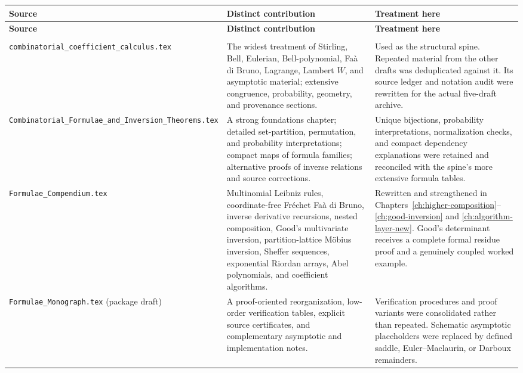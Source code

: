 \documentclass[11pt,a4paper,oneside,openany]{book}
\theoremstyle{definition}
\theoremstyle{remark}
\begin{document}
\renewcommand{\arraystretch}{1.15}
\begin{longtable}{>{\raggedright\arraybackslash}p{}
                  >{\raggedright\arraybackslash}p{}
                  >{\raggedright\arraybackslash}p{}}
\toprule
\textbf{Source} & \textbf{Distinct contribution} & \textbf{Treatment here}\\
\midrule
\endfirsthead
\toprule
\textbf{Source} & \textbf{Distinct contribution} & \textbf{Treatment here}\\
\midrule
\endhead
\midrule
\multicolumn{3}{r}{\small Continued on the next page}\\
\endfoot
\bottomrule
\endlastfoot

\nolinkurl{combinatorial_coefficient_calculus.tex}
& The widest treatment of Stirling, Bell, Eulerian, Bell-polynomial, Fa\`a di
  Bruno, Lagrange, Lambert $W$, and asymptotic material; extensive congruence,
  probability, geometry, and provenance sections.
& Used as the structural spine.  Repeated material from the other drafts was
  deduplicated against it.  Its source ledger and notation audit were rewritten
  for the actual five-draft archive.\\[1ex]

\nolinkurl{Combinatorial_Formulae_and_Inversion_Theorems.tex}
& A strong foundations chapter; detailed set-partition, permutation, and
  probability interpretations; compact maps of formula families; alternative
  proofs of inverse relations and source corrections.
& Unique bijections, probability interpretations, normalization checks, and
  compact dependency explanations were retained and reconciled with the spine's
  more extensive formula tables.\\[1ex]

\nolinkurl{Formulae_Compendium.tex}
& Multinomial Leibniz rules, coordinate-free Fr\'echet Fa\`a di Bruno, inverse
  derivative recursions, nested composition, Good's multivariate inversion,
  partition-lattice M\"obius inversion, Sheffer sequences, exponential Riordan
  arrays, Abel polynomials, and coefficient algorithms.
& Rewritten and strengthened in
  Chapters~\ref{ch:higher-composition}--\ref{ch:good-inversion} and
  \ref{ch:algorithm-layer-new}.  Good's determinant receives a complete formal
  residue proof and a genuinely coupled worked example.\\[1ex]

\nolinkurl{Formulae_Monograph.tex} (package draft)
& A proof-oriented reorganization, low-order verification tables, explicit
  source certificates, and complementary asymptotic and implementation notes.
& Verification procedures and proof variants were consolidated rather than
  repeated.  Schematic asymptotic placeholders were replaced by defined saddle,
  Euler--Maclaurin, or Darboux remainders.\\[1ex]


\end{longtable}
\end{document}
